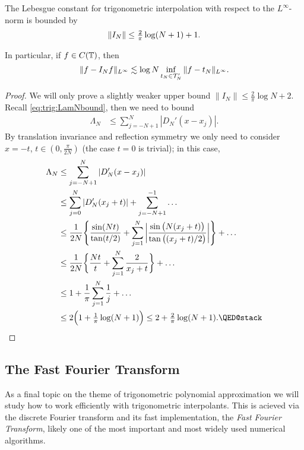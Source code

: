 \begin{theorem} \label{th:trig:lebesgue}
  The Lebesgue constant for trigonometric interpolation with respect to the
  $L^\infty$-norm is bounded by
  \[
    \|I_N\| \leq {\textstyle \frac{2}{\pi}} \log (N+1) + 1.
  \]

  In particular, if $f \in C(\mathbb{T})$, then
  \[
      \| f - I_N f \|_{L^\infty}
        \lesssim \log N \inf_{t_N \in \mathcal{T}_N'} \| f - t_N \|_{L^\infty}.
  \]
\end{theorem}
\begin{proof}
  We will only prove a slightly weaker upper bound $\|I_N\| \leq \frac{2}{\pi} \log N + 2$. Recall
\eqref{eq:trig:LamNbound}, then we need to bound
  \begin{align*}
    \Lambda_N
    &\leq
    \sum_{j =  -N+1}^N |D_N'(x - x_j)|.
  \end{align*}
  By translation invariance and reflection symmetry we only need to consider $x
  = -t$, $t \in (0, \frac{\pi}{2N})$ (the case $t = 0$ is trivial); in this
  case,
  \begin{align*}
    \Lambda_N
    &\leq
    \sum_{j =  -N+1}^N |D_N'(x - x_j)| \\
    &\leq
    \sum_{j =  0}^N |D_N'(x_j+t)|  + \sum_{j = -N+1}^{-1} \dots \\
    &\leq
    \frac{1}{2N} \Bg\{
        \frac{\sin(Nt)}{\tan(t/2)}
        + \sum_{j = 1}^N
        \bg|\frac{\sin\b(N(x_j+t)\b)}{\tan\b((x_j+t)/2\b)}\bg|
      \Bg\} + \dots \\
    &\leq
    \frac{1}{2N} \bg\{
        \frac{Nt}{t} + \sum_{j = 1}^N \frac{2}{ x_j+t }
    \bg\} + \dots \\
    &\leq
    1 + \frac{1}{\pi} \sum_{j = 1}^N \frac{1}{j} + \dots \\
    &\leq
    2\Big( 1 + \smfrac{1}{\pi} \log(N+1) \Big)
    \leq 2 + \smfrac{2}{\pi} \log(N+1).
    \qedhere
  \end{align*}
\end{proof}


\subsection{The Fast Fourier Transform}
%
\label{sec:trig:fft}
%
As a final topic on the theme of trigonometric polynomial approximation we will
study how to work efficiently with trigonometric interpolants. This is acieved
via the discrete Fourier transform and its fast implementation, the {\it Fast
Fourier Transform}, likely one of the most important and most widely used
numerical algorithms.

